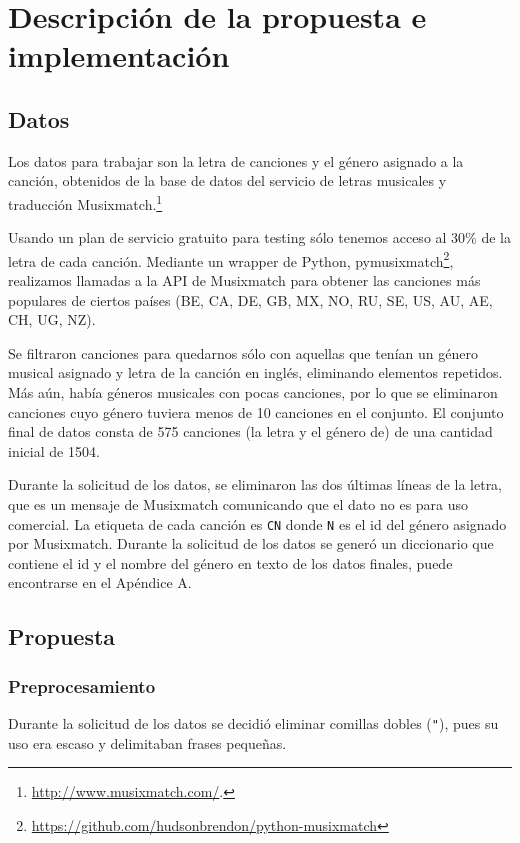 \documentclass[spanish,11pt,letterpaper]{article}
\begin{document}
\section{Descripción de la propuesta e implementación}

\subsection{Datos}

Los datos para trabajar son la letra de canciones y el género asignado a la canción,
obtenidos de la base de datos del servicio de letras musicales y traducción
Musixmatch.\footnote{\url{http://www.musixmatch.com/}.}

Usando un plan de servicio gratuito para testing sólo tenemos acceso al 30\% de
la letra de cada canción. Mediante un wrapper de Python,
pymusixmatch\footnote{\url{https://github.com/hudsonbrendon/python-musixmatch}},
realizamos llamadas a la API de Musixmatch para obtener las canciones más populares
de ciertos países (BE, CA, DE, GB, MX, NO, RU, SE, US, AU, AE, CH, UG, NZ).

Se filtraron canciones para quedarnos sólo con aquellas que tenían un género musical
asignado y letra de la canción en inglés, eliminando elementos repetidos.
Más aún, había géneros musicales con pocas canciones, por lo que se eliminaron
canciones cuyo género tuviera menos de 10 canciones en el conjunto. El conjunto final
de datos consta de 575 canciones (la letra y el género de) de una cantidad
inicial de 1504.

Durante la solicitud de los datos, se eliminaron las dos últimas líneas de la letra, que
es un mensaje de Musixmatch comunicando que el dato no es para uso comercial.
La etiqueta de cada canción es \texttt{CN} donde \texttt{N} es el id del género
asignado por Musixmatch. Durante la solicitud de los datos se generó un diccionario
que contiene el id y el nombre del género en texto de los datos finales,
puede encontrarse en el Apéndice A.

\subsection{Propuesta}

\subsubsection{Preprocesamiento}

Durante la solicitud de los datos se decidió eliminar comillas dobles (\texttt{"}),
pues su uso era escaso y delimitaban frases pequeñas.
\end{document}
